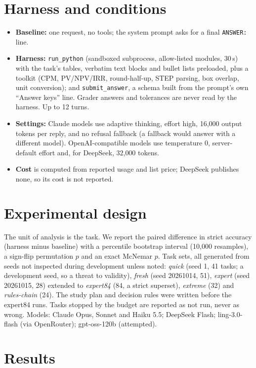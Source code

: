 \documentclass[11pt]{article}
\begin{document}
\section{Harness and conditions}
\begin{itemize}
\item \textbf{Baseline:} one request, no tools; the system prompt asks for a final \texttt{ANSWER:} line.
\item \textbf{Harness:} \texttt{run\_python} (sandboxed subprocess, allow-listed modules, 30\,s) with the task's tables, verbatim text blocks and bullet lists preloaded, plus a toolkit (CPM, PV/NPV/IRR, round-half-up, STEP parsing, box overlap, unit conversion); and \texttt{submit\_answer}, a schema built from the prompt's own ``Answer keys'' line. Grader answers and tolerances are never read by the harness. Up to 12 turns.
\item \textbf{Settings:} Claude models use adaptive thinking, effort high, 16{,}000 output tokens per reply, and no refusal fallback (a fallback would answer with a different model). OpenAI-compatible models use temperature 0, server-default effort and, for DeepSeek, 32{,}000 tokens.
\item \textbf{Cost} is computed from reported usage and list price; DeepSeek publishes none, so its cost is not reported.
\end{itemize}

\section{Experimental design}
The unit of analysis is the task. We report the paired difference in strict accuracy (harness minus baseline) with a percentile bootstrap interval (10{,}000 resamples), a sign-flip permutation $p$ and an exact McNemar $p$. Task sets, all generated from seeds not inspected during development unless noted: \emph{quick} (seed 1, 41 tasks; a development seed, so a threat to validity), \emph{fresh} (seed 20261014, 51), \emph{expert} (seed 20261015, 28) extended to \emph{expert84} (84, a strict superset), \emph{extreme} (32) and \emph{rules-chain} (24). The study plan and decision rules were written before the expert84 runs. Tasks stopped by the budget are reported as not run, never as wrong. Models: Claude Opus, Sonnet and Haiku 5.5; DeepSeek Flash; ling-3.0-flash (via OpenRouter); gpt-oss-120b (attempted).

\section{Results}
\end{document}
